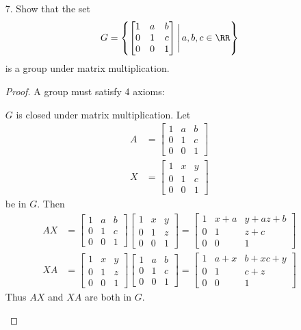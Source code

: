 \documentclass{article}
\begin{document}
\begin{itemize}
	\item[7.] Show that the set \[G=\left\{ \begin{bmatrix}
			1 & a & b \\
			0 & 1 & c \\
			0 & 0 & 1
	\end{bmatrix}\Bigg\vert\, a, b, c\in\RR\right\} \] is a group under matrix multiplication.
	\begin{proof}
		A group must satisfy 4 axioms:
		\begin{enumerate}
			\ii $G$ is closed under matrix multiplication. Let
			\begin{align*}
				A &= \begin{bmatrix}
					1 & a & b \\
					0 & 1 & c \\
					0 & 0 & 1
				\end{bmatrix} \\
				X &= \begin{bmatrix}
					1 & x & y \\
					0 & 1 & c \\
					0 & 0 & 1
				\end{bmatrix}
			\end{align*}
			be in $G.$ Then 
			\begin{align*}
				AX &= \begin{bmatrix}
					1 & a & b \\
					0 & 1 & c \\
					0 & 0 & 1
				\end{bmatrix} \begin{bmatrix}
					1 & x & y \\
					0 & 1 & z \\
					0 & 0 & 1
				\end{bmatrix} = \begin{bmatrix}
					1 & x+a & y+az+b \\
					0 & 1 & z+c \\
					0 & 0 & 1
				\end{bmatrix} \\
				XA &= \begin{bmatrix}
					1 & x & y \\
					0 & 1 & z \\
					0 & 0 & 1
				\end{bmatrix} \begin{bmatrix}
					1 & a & b \\
					0 & 1 & c \\
					0 & 0 & 1
				\end{bmatrix} = \begin{bmatrix}
					1 & a+x & b+xc+y \\
					0 & 1 & c+z \\
					0 & 0 & 1
				\end{bmatrix}
			\end{align*}
			Thus $AX$ and $XA$ are both in $G.$


\end{enumerate}
\end{proof}
\end{itemize}
\end{document}
